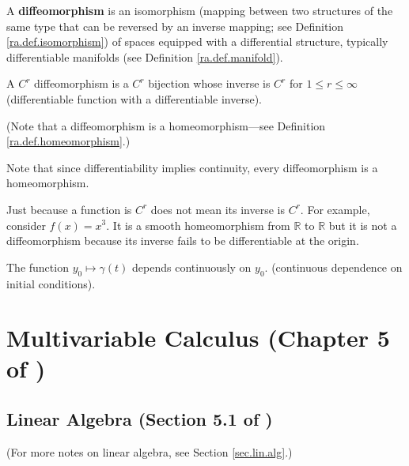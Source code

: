 \begin{definition}\label{ra.def.diffeo}

A \textbf{diffeomorphism} is an isomorphism (mapping between two structures of the same type that can be reversed by an inverse mapping; see Definition \ref{ra.def.isomorphism}) of spaces equipped with a differential structure, typically differentiable manifolds (see Definition \ref{ra.def.manifold}).

A \(C^r\) diffeomorphism is a \(C^r\) bijection whose inverse is \(C^r\) for \(1 \leq r \leq \infty\) (differentiable function with a differentiable inverse). 

(Note that a diffeomorphism is a homeomorphism---see Definition \ref{ra.def.homeomorphism}.)

\end{definition}



Note that since differentiability implies continuity, every diffeomorphism is a homeomorphism.

\begin{example}

Just because a function is \(C^r\) does not mean its inverse is \(C^r\). For example, consider \(f(x) = x^3\). It is a smooth homeomorphism from \(\mathbb{R}\) to \(\mathbb{R}\) but it is not a diffeomorphism because its inverse fails to be differentiable at the origin.


\end{example}

\begin{proposition}\label{ra.ode.flow.cont}

The function \(y_0 \mapsto \gamma(t) \) depends continuously on \(y_0\). (continuous dependence on initial conditions).

\end{proposition}

\section{Multivariable Calculus (Chapter 5 of \citet{pugh2015real})}

\subsection{Linear Algebra (Section 5.1 of \citet{pugh2015real})}\label{ra.lin.alg.5.1.pugh}

(For more notes on linear algebra, see Section \ref{sec.lin.alg}.)

